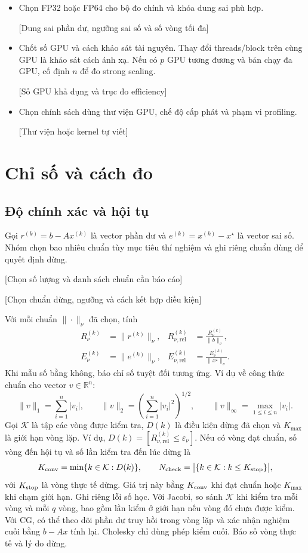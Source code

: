 \documentclass[11pt,a4paper]{article}
\newcommand{\dien}[1]{\colorbox{placeholder}{\strut\small [#1]}}
\begin{document}
\begin{itemize}
  \item Chọn FP32 hoặc FP64 cho bộ đo chính và khóa dung sai phù hợp.
        \par\noindent\dien{Dung sai phần dư, ngưỡng sai số và số vòng tối đa}
  \item Chốt số GPU và cách khảo sát tài nguyên. Thay đổi threads/block
        trên cùng GPU là khảo sát cách ánh xạ. Nếu có $p$ GPU tương
        đương và bản chạy đa GPU, cố định $n$ để đo strong scaling.
        \dien{Số GPU khả dụng và trục đo efficiency}
  \item Chọn chính sách dùng thư viện GPU, chế độ cấp phát và phạm vi
        profiling. \par\noindent\dien{Thư viện hoặc kernel tự viết}
\end{itemize}

\newpage
\section{Chỉ số và cách đo}

\subsection{Độ chính xác và hội tụ}

Gọi $r^{(k)}=b-Ax^{(k)}$ là vector phần dư và
$e^{(k)}=x^{(k)}-x^\star$ là vector sai số. Nhóm chọn bao nhiêu chuẩn
tùy mục tiêu thí nghiệm và ghi riêng chuẩn dùng để quyết định dừng.

\noindent \dien{Chọn số lượng và danh sách chuẩn cần báo cáo}

\noindent \dien{Chọn chuẩn dừng, ngưỡng và cách kết hợp điều kiện}

Với mỗi chuẩn $\|\cdot\|_{\nu}$ đã chọn, tính
\begin{align*}
  R_{\nu}^{(k)} &= \|r^{(k)}\|_{\nu},
  & R_{\nu,\mathrm{rel}}^{(k)} &= \frac{R_{\nu}^{(k)}}{\|b\|_{\nu}},\\
  E_{\nu}^{(k)} &= \|e^{(k)}\|_{\nu},
  & E_{\nu,\mathrm{rel}}^{(k)} &= \frac{E_{\nu}^{(k)}}{\|x^\star\|_{\nu}}.
\end{align*}
Khi mẫu số bằng không, báo chỉ số tuyệt đối tương ứng. Ví dụ về công thức
chuẩn cho vector $v\in\mathbb R^n$:
\[
  \|v\|_1=\sum_{i=1}^n|v_i|,\qquad
  \|v\|_2=\left(\sum_{i=1}^n|v_i|^2\right)^{1/2},\qquad
  \|v\|_{\infty}=\max_{1\le i\le n}|v_i|.
\]
Gọi $\mathcal K$ là tập các vòng được kiểm tra, $D(k)$ là điều kiện dừng
đã chọn và $K_{\max}$ là giới hạn vòng lặp. Ví dụ,
$D(k)=[R_{\nu,\mathrm{rel}}^{(k)}\le\varepsilon_\nu]$. Nếu có vòng đạt
chuẩn, số vòng đến hội tụ và số lần kiểm tra đến lúc dừng là
\[
  K_{\rm conv}=\min\{k\in\mathcal K:D(k)\},\qquad
  N_{\rm check}=\bigl|\{k\in\mathcal K:k\le K_{\rm stop}\}\bigr|,
\]
với $K_{\rm stop}$ là vòng thực tế dừng. Giá trị này bằng $K_{\rm conv}$
khi đạt chuẩn hoặc $K_{\max}$ khi chạm giới hạn. Ghi riêng lỗi số học. Với Jacobi,
so sánh $\mathcal K$ khi kiểm tra mỗi vòng và mỗi $q$ vòng, bao gồm lần
kiểm ở giới hạn nếu vòng đó chưa được kiểm. Với CG, có thể theo dõi phần
dư truy hồi trong vòng lặp và xác nhận nghiệm cuối bằng $b-Ax$ tính lại.
Cholesky chỉ dùng phép kiểm cuối. Báo số vòng thực tế và lý do dừng.
\end{document}
